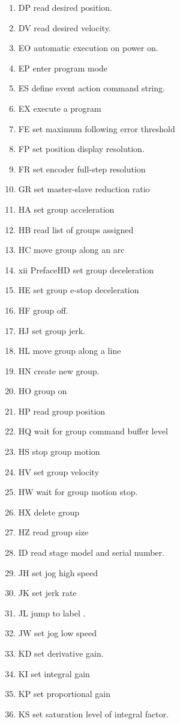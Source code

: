 \documentclass[10pt,letter,twoside]{report}
\begin{document}
\begin{enumerate}
\item DP read desired position. 
\item DV read desired velocity. 
\item EO automatic execution on power on. 
\item EP enter program mode 
\item ES define event action command string. 
\item EX execute a program 
\item FE set maximum following error threshold 
\item FP set position display resolution. 
\item FR set encoder full-step resolution 
\item GR set master-slave reduction ratio  
\item HA set group acceleration  
\item HB read list of groups assigned 
\item HC move group along an arc 
\item xii PrefaceHD set group deceleration 
\item HE set group e-stop deceleration  
\item HF group off. 
\item HJ set group jerk. 
\item HL move group along a line 
\item HN create new group. 
\item HO group on 
\item HP read group position  
\item HQ wait for group command buffer level 
\item HS stop group motion 
\item HV set group velocity 
\item HW wait for group motion stop. 
\item HX delete group 
\item HZ read group size 
\item ID read stage model and serial number. 
\item JH set jog high speed 
\item JK set jerk rate 
\item JL jump to label . 
\item JW set jog low speed 
\item KD set derivative gain. 
\item KI set integral gain 
\item KP set proportional gain  
\item KS set saturation level of integral factor. 

\end{enumerate}
\end{document}
